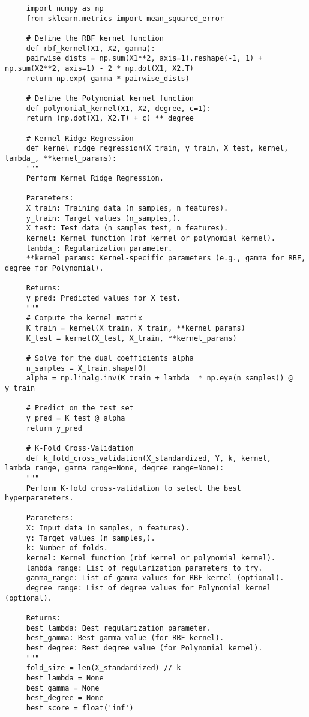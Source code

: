 \documentclass[letterpaper]{article}
\begin{document}
\begin{lstlisting}
     import numpy as np
     from sklearn.metrics import mean_squared_error
     
     # Define the RBF kernel function
     def rbf_kernel(X1, X2, gamma):
     pairwise_dists = np.sum(X1**2, axis=1).reshape(-1, 1) + np.sum(X2**2, axis=1) - 2 * np.dot(X1, X2.T)
     return np.exp(-gamma * pairwise_dists)
     
     # Define the Polynomial kernel function
     def polynomial_kernel(X1, X2, degree, c=1):
     return (np.dot(X1, X2.T) + c) ** degree
     
     # Kernel Ridge Regression
     def kernel_ridge_regression(X_train, y_train, X_test, kernel, lambda_, **kernel_params):
     """
     Perform Kernel Ridge Regression.
     
     Parameters:
     X_train: Training data (n_samples, n_features).
     y_train: Target values (n_samples,).
     X_test: Test data (n_samples_test, n_features).
     kernel: Kernel function (rbf_kernel or polynomial_kernel).
     lambda_: Regularization parameter.
     **kernel_params: Kernel-specific parameters (e.g., gamma for RBF, degree for Polynomial).
     
     Returns:
     y_pred: Predicted values for X_test.
     """
     # Compute the kernel matrix
     K_train = kernel(X_train, X_train, **kernel_params)
     K_test = kernel(X_test, X_train, **kernel_params)
     
     # Solve for the dual coefficients alpha
     n_samples = X_train.shape[0]
     alpha = np.linalg.inv(K_train + lambda_ * np.eye(n_samples)) @ y_train
     
     # Predict on the test set
     y_pred = K_test @ alpha
     return y_pred
     
     # K-Fold Cross-Validation
     def k_fold_cross_validation(X_standardized, Y, k, kernel, lambda_range, gamma_range=None, degree_range=None):
     """
     Perform K-fold cross-validation to select the best hyperparameters.
     
     Parameters:
     X: Input data (n_samples, n_features).
     y: Target values (n_samples,).
     k: Number of folds.
     kernel: Kernel function (rbf_kernel or polynomial_kernel).
     lambda_range: List of regularization parameters to try.
     gamma_range: List of gamma values for RBF kernel (optional).
     degree_range: List of degree values for Polynomial kernel (optional).
     
     Returns:
     best_lambda: Best regularization parameter.
     best_gamma: Best gamma value (for RBF kernel).
     best_degree: Best degree value (for Polynomial kernel).
     """
     fold_size = len(X_standardized) // k
     best_lambda = None
     best_gamma = None
     best_degree = None
     best_score = float('inf')
     

\end{lstlisting}
\end{document}
